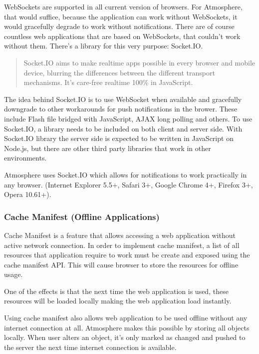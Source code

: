 WebSockets are supported in all current version of browsers. For Atmosphere, that would suffice, because the application can work without WebSockets, it would gracefully degrade to work without notifications. There are of course countless web applications that are based on WebSockets, that couldn’t work without them. There’s a library for this very purpose: Socket.IO. \citep{socketio}

\begin{quotation}
Socket.IO aims to make realtime apps possible in every browser and mobile device, blurring the differences between the different transport mechanisms. It's care-free realtime 100\% in JavaScript. \citep{socketio}
\end{quotation}

The idea behind Socket.IO is to use WebSocket when available and gracefully downgrade to other workarounds for push notifications in the brower. These include Flash file bridged with JavaScript, AJAX long polling and others. To use Socket.IO, a library needs to be included on both client and server side. With Socket.IO library the server side is expected to be written in JavaScript on Node.js, but there are other third party libraries that work in other environments.

Atmosphere uses Socket.IO which allows for notifications to work practically in any browser. (Internet Explorer 5.5+, Safari 3+, Google Chrome 4+, Firefox 3+, Opera 10.61+).

\subsubsection{Cache Manifest (Offline Applications)}

Cache Manifest is a feature that allows accessing a web application without active network connection. In order to implement cache manifest, a list of all resources that application require to work must be create and exposed using the cache manifest API. This will cause browser to store the resources for offline usage.

One of the effects is that the next time the web application is used, these resources will be loaded locally making the web application load instantly.

Using cache manifest also allows web application to be used offline without any internet connection at all. Atmosphere makes this possible by storing all objects locally. When user alters an object, it’s only marked as changed and pushed to the server the next time internet connection is available. 

